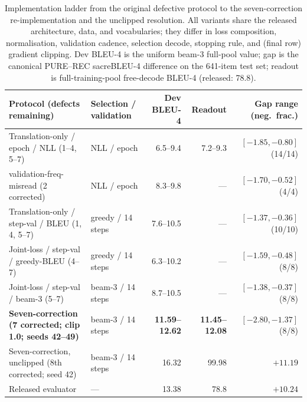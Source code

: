 \documentclass[pdflatex,sn-chicago]{sn-jnl}
\begin{document}
\begin{table}[h]
\centering
\scriptsize\setlength{\tabcolsep}{3pt}
\caption{Implementation ladder from the original defective protocol to the seven-correction re-implementation and the unclipped resolution. All variants share the released architecture, data, and vocabularies; they differ in loss composition, normalisation, validation cadence, selection decode, stopping rule, and (final row) gradient clipping. Dev BLEU-4 is the uniform beam-3 full-pool value; gap is the canonical PURE--REC sacreBLEU-4 difference on the 641-item test set; readout is full-training-pool free-decode BLEU-4 (released: 78.8).}
\label{tab:protocol_robustness}
\begin{tabular}{p{3.4cm}p{2.6cm}rrr}
\toprule
Protocol (defects remaining) & Selection / validation & Dev BLEU-4 & Readout & Gap range (neg.\ frac.) \\
\midrule
Translation-only / epoch / NLL (1--4, 5--7) & NLL / epoch & 6.5--9.4 & 7.2--9.3 & $[-1.85,-0.80]$ (14/14) \\
\quad validation-freq-misread (2 corrected) & NLL / epoch & 8.3--9.8 & --- & $[-1.70,-0.52]$ (4/4) \\
Translation-only / step-val / BLEU (1, 4, 5--7) & greedy / 14 steps & 7.6--10.5 & --- & $[-1.37,-0.36]$ (10/10) \\
Joint-loss / step-val / greedy-BLEU (4--7) & greedy / 14 steps & 6.3--10.2 & --- & $[-1.59,-0.48]$ (8/8) \\
Joint-loss / step-val / beam-3 (5--7) & beam-3 / 14 steps & 8.7--10.5 & --- & $[-1.38,-0.37]$ (8/8) \\
\textbf{Seven-correction (7 corrected; clip 1.0; seeds 42--49)} & beam-3 / 14 steps & \textbf{11.59--12.62} & \textbf{11.45--12.08} & $\mathbf{[-2.80,-1.37]}$ (8/8) \\
Seven-correction, unclipped (8th corrected; seed 42) & beam-3 / 14 steps & 16.32 & 99.98 & $+11.19$ \\
\midrule
Released evaluator & --- & 13.38 & 78.8 & $+10.24$ \\
\bottomrule
\end{tabular}
\end{table}
\end{document}
